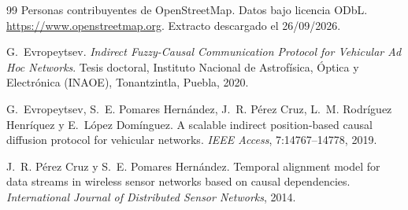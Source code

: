 \documentclass[11pt,letterpaper]{article}
\begin{document}
\begin{thebibliography}{99}
 Personas contribuyentes de OpenStreetMap. Datos bajo licencia ODbL.
\url{https://www.openstreetmap.org}. Extracto descargado el 26/09/2026.


 G.~Evropeytsev. \emph{Indirect Fuzzy-Causal Communication
Protocol for Vehicular Ad Hoc Networks}. Tesis doctoral, Instituto Nacional de
Astrofísica, Óptica y Electrónica (INAOE), Tonantzintla, Puebla, 2020.

 G.~Evropeytsev, S.~E. Pomares Hernández, J.~R. Pérez Cruz,
L.~M. Rodríguez Henríquez y E.~López Domínguez. A scalable indirect
position-based causal diffusion protocol for vehicular networks. \emph{IEEE
Access}, 7:14767--14778, 2019.

 J.~R. Pérez Cruz y S.~E. Pomares Hernández. Temporal alignment
model for data streams in wireless sensor networks based on causal dependencies.
\emph{International Journal of Distributed Sensor Networks}, 2014.
\end{thebibliography}
\end{document}
